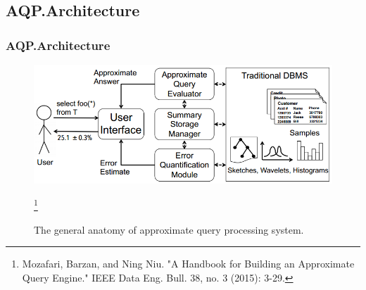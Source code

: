\documentclass{beamer}
\begin{document}
\subsection{AQP.Architecture}
\begin{frame}
\frametitle{AQP.Architecture}
\begin{figure}
\includegraphics[scale=0.5]{img/blinkdb-workflow.png}
\caption{The general anatomy of approximate query processing system.}
\footnote{\tiny Mozafari, Barzan, and Ning Niu. "A Handbook for Building an Approximate Query Engine." IEEE Data Eng. Bull. 38, no. 3 (2015): 3-29.}
\end{figure}
\end{frame}

\end{document}
